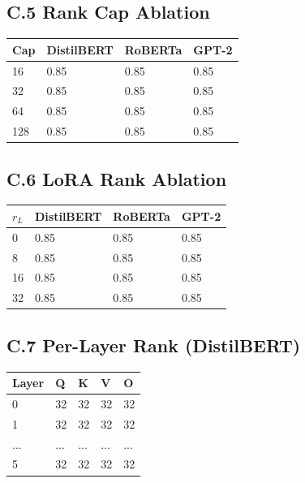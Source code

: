 \subsection{C.5 Rank Cap Ablation}

\begin{table}[H]
\centering
\small
\begin{tabular}{llll}
\toprule
\textbf{Cap} & \textbf{DistilBERT} & \textbf{RoBERTa} & \textbf{GPT-2} \\
\midrule
16 & 0.85 & 0.85 & 0.85 \\
32 & 0.85 & 0.85 & 0.85 \\
64 & 0.85 & 0.85 & 0.85 \\
128 & 0.85 & 0.85 & 0.85 \\
\bottomrule
\end{tabular}
\end{table}

\subsection{C.6 LoRA Rank Ablation}

\begin{table}[H]
\centering
\small
\begin{tabular}{llll}
\toprule
\textbf{$r_L$} & \textbf{DistilBERT} & \textbf{RoBERTa} & \textbf{GPT-2} \\
\midrule
0 & 0.85 & 0.85 & 0.85 \\
8 & 0.85 & 0.85 & 0.85 \\
16 & 0.85 & 0.85 & 0.85 \\
32 & 0.85 & 0.85 & 0.85 \\
\bottomrule
\end{tabular}
\end{table}

\subsection{C.7 Per-Layer Rank (DistilBERT)}

\begin{table}[H]
\centering
\small
\begin{tabular}{lllll}
\toprule
\textbf{Layer} & \textbf{Q} & \textbf{K} & \textbf{V} & \textbf{O} \\
\midrule
0 & 32 & 32 & 32 & 32 \\
1 & 32 & 32 & 32 & 32 \\
... & ... & ... & ... & ... \\
5 & 32 & 32 & 32 & 32 \\
\bottomrule
\end{tabular}
\end{table}

